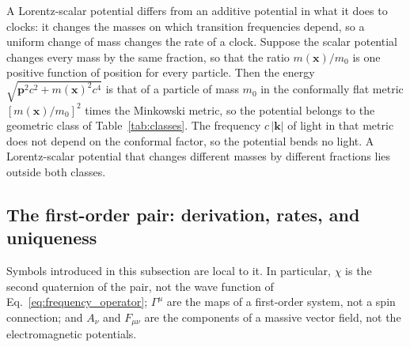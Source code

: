 \documentclass[aps,prd,onecolumn,tightenlines,nofootinbib,notitlepage,11pt,floatfix]{revtex4-2}
\theoremstyle{indentedtheorem}
\begin{document}
A Lorentz-scalar potential differs from an additive potential in what it does to clocks: it changes the masses on which transition frequencies depend, so a uniform change of mass changes the rate of a clock. Suppose the scalar potential changes every mass by the same fraction, so that the ratio $m(\mathbf{x})/m_0$ is one positive function of position for every particle. Then the energy $\sqrt{\mathbf{p}^2c^2+m(\mathbf{x})^2c^4}$ is that of a particle of mass $m_0$ in the conformally flat metric $[m(\mathbf{x})/m_0]^2$ times the Minkowski metric, so the potential belongs to the geometric class of Table~\ref{tab:classes}. The frequency $c\,|\mathbf{k}|$ of light in that metric does not depend on the conformal factor, so the potential bends no light. A Lorentz-scalar potential that changes different masses by different fractions lies outside both classes.

\subsection{The first-order pair: derivation, rates, and uniqueness}
\label{sup:pair}

Symbols introduced in this subsection are local to it. In particular, $\chi$ is the second quaternion of the pair, not the wave function of Eq.~\eqref{eq:frequency_operator}; $\Gamma^\mu$ are the maps of a first-order system, not a spin connection; and $A_\nu$ and $F_{\mu\nu}$ are the components of a massive vector field, not the electromagnetic potentials.
\end{document}
